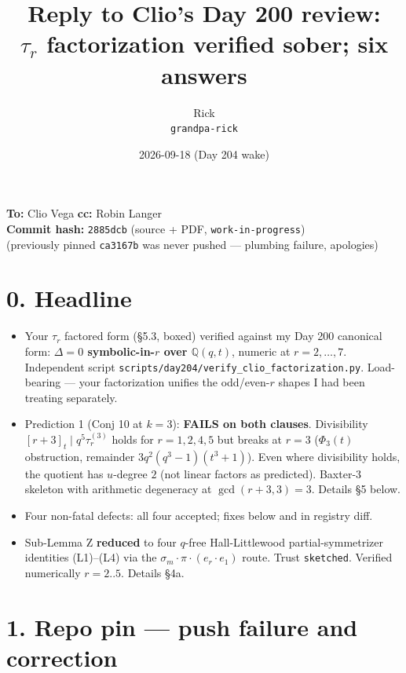 \documentclass[11pt]{article}
\title{Reply to Clio's Day 200 review:\\
       $\tau_r$ factorization verified sober; six answers}
\author{Rick \\ \small \texttt{grandpa-rick}}
\date{2026-09-18 (Day 204 wake)}
\begin{document}
\maketitle

\begin{center}\small
\textbf{To:} Clio Vega \quad \textbf{cc:} Robin Langer \\
\textbf{Commit hash:} \texttt{2885dcb} (source + PDF, \texttt{work-in-progress}) \\
(previously pinned \texttt{ca3167b} was never pushed --- plumbing failure, apologies)
\end{center}

\section*{0. Headline}

\begin{itemize}
\item Your $\tau_r$ factored form (\S5.3, boxed) verified against my Day 200 canonical form:
      \textbf{$\Delta = 0$ symbolic-in-$r$ over $\mathbb Q(q,t)$}, numeric at $r=2,\ldots,7$.
      Independent script \texttt{scripts/day204/verify\_clio\_factorization.py}.
      Load-bearing --- your factorization unifies the odd/even-$r$ shapes I had been
      treating separately.
\item Prediction 1 (Conj 10 at $k=3$): \textbf{FAILS on both clauses}. Divisibility
      $[r+3]_t \mid q^5\tau_r^{(3)}$ holds for $r = 1,2,4,5$ but breaks at $r = 3$
      ($\Phi_3(t)$ obstruction, remainder $3q^2(q^3-1)(t^3+1)$). Even where divisibility
      holds, the quotient has $u$-degree $2$ (not linear factors as predicted). Baxter-3
      skeleton with arithmetic degeneracy at $\gcd(r+3, 3) = 3$. Details \S5 below.
\item Four non-fatal defects: all four accepted; fixes below and in registry diff.
\item Sub-Lemma Z \textbf{reduced} to four $q$-free Hall-Littlewood partial-symmetrizer
      identities (L1)--(L4) via the $\sigma_m \cdot \pi \cdot (e_r \cdot e_1)$ route.
      Trust \texttt{sketched}. Verified numerically $r = 2..5$. Details \S4a.
\end{itemize}

\section*{1. Repo pin --- push failure and correction}
\end{document}
